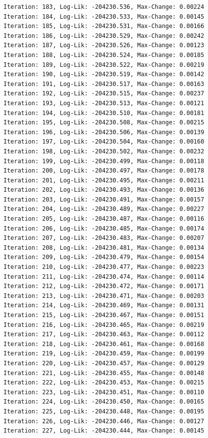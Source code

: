 \documentclass[
  letterpaper,
  DIV=11,
  numbers=noendperiod]{scrreport}
\begin{document}
\begin{verbatim}
Iteration: 183, Log-Lik: -204230.536, Max-Change: 0.00224
Iteration: 184, Log-Lik: -204230.533, Max-Change: 0.00145
Iteration: 185, Log-Lik: -204230.531, Max-Change: 0.00166
Iteration: 186, Log-Lik: -204230.529, Max-Change: 0.00242
Iteration: 187, Log-Lik: -204230.526, Max-Change: 0.00123
Iteration: 188, Log-Lik: -204230.524, Max-Change: 0.00185
Iteration: 189, Log-Lik: -204230.522, Max-Change: 0.00219
Iteration: 190, Log-Lik: -204230.519, Max-Change: 0.00142
Iteration: 191, Log-Lik: -204230.517, Max-Change: 0.00163
Iteration: 192, Log-Lik: -204230.515, Max-Change: 0.00237
Iteration: 193, Log-Lik: -204230.513, Max-Change: 0.00121
Iteration: 194, Log-Lik: -204230.510, Max-Change: 0.00181
Iteration: 195, Log-Lik: -204230.508, Max-Change: 0.00215
Iteration: 196, Log-Lik: -204230.506, Max-Change: 0.00139
Iteration: 197, Log-Lik: -204230.504, Max-Change: 0.00160
Iteration: 198, Log-Lik: -204230.502, Max-Change: 0.00232
Iteration: 199, Log-Lik: -204230.499, Max-Change: 0.00118
Iteration: 200, Log-Lik: -204230.497, Max-Change: 0.00178
Iteration: 201, Log-Lik: -204230.495, Max-Change: 0.00211
Iteration: 202, Log-Lik: -204230.493, Max-Change: 0.00136
Iteration: 203, Log-Lik: -204230.491, Max-Change: 0.00157
Iteration: 204, Log-Lik: -204230.489, Max-Change: 0.00227
Iteration: 205, Log-Lik: -204230.487, Max-Change: 0.00116
Iteration: 206, Log-Lik: -204230.485, Max-Change: 0.00174
Iteration: 207, Log-Lik: -204230.483, Max-Change: 0.00207
Iteration: 208, Log-Lik: -204230.481, Max-Change: 0.00134
Iteration: 209, Log-Lik: -204230.479, Max-Change: 0.00154
Iteration: 210, Log-Lik: -204230.477, Max-Change: 0.00223
Iteration: 211, Log-Lik: -204230.474, Max-Change: 0.00114
Iteration: 212, Log-Lik: -204230.472, Max-Change: 0.00171
Iteration: 213, Log-Lik: -204230.471, Max-Change: 0.00203
Iteration: 214, Log-Lik: -204230.469, Max-Change: 0.00131
Iteration: 215, Log-Lik: -204230.467, Max-Change: 0.00151
Iteration: 216, Log-Lik: -204230.465, Max-Change: 0.00219
Iteration: 217, Log-Lik: -204230.463, Max-Change: 0.00112
Iteration: 218, Log-Lik: -204230.461, Max-Change: 0.00168
Iteration: 219, Log-Lik: -204230.459, Max-Change: 0.00199
Iteration: 220, Log-Lik: -204230.457, Max-Change: 0.00129
Iteration: 221, Log-Lik: -204230.455, Max-Change: 0.00148
Iteration: 222, Log-Lik: -204230.453, Max-Change: 0.00215
Iteration: 223, Log-Lik: -204230.451, Max-Change: 0.00110
Iteration: 224, Log-Lik: -204230.450, Max-Change: 0.00165
Iteration: 225, Log-Lik: -204230.448, Max-Change: 0.00195
Iteration: 226, Log-Lik: -204230.446, Max-Change: 0.00127
Iteration: 227, Log-Lik: -204230.444, Max-Change: 0.00145

\end{verbatim}
\end{document}
